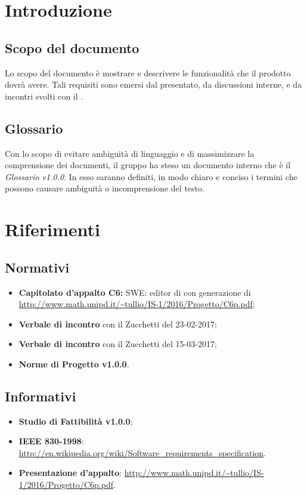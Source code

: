 \section{Introduzione}
\subsection{Scopo del documento}
Lo scopo del documento è mostrare e descrivere le funzionalità che il prodotto dovrà avere. Tali requisiti sono emersi dal  presentato, da discussioni interne, e da incontri svolti con il .

\subsection{Glossario}
          Con lo scopo di evitare ambiguità di linguaggio e di massimizzare la comprensione dei documenti, il
          gruppo ha steso un documento interno che è il \emph{Glossario v1.0.0}. In esso saranno definiti, in modo
          chiaro e conciso i termini che possono causare ambiguità o incomprensione del testo.
  \newpage        
\section{Riferimenti}
\subsection{Normativi}
\begin{itemize}
\item \textbf{Capitolato d'appalto C6:} SWE: editor di   con generazione di  \\
\url{http://www.math.unipd.it/~tullio/IS-1/2016/Progetto/C6p.pdf};
\item \textbf{Verbale di incontro} con il  Zucchetti del 23-02-2017;
\item \textbf{Verbale di incontro} con il  Zucchetti del 15-03-2017;
\item \textbf{Norme di Progetto v1.0.0}.
\end{itemize}
\subsection{Informativi}
\begin{itemize}
\item \textbf{Studio di Fattibilità v1.0.0};
\item \textbf{IEEE 830-1998}: \url{http://en.wikipedia.org/wiki/Software_requirements_specification}.
\item \textbf{Presentazione  d'appalto}: \url{http://www.math.unipd.it/~tullio/IS-1/2016/Progetto/C6p.pdf}.
\end{itemize}
\newpage
